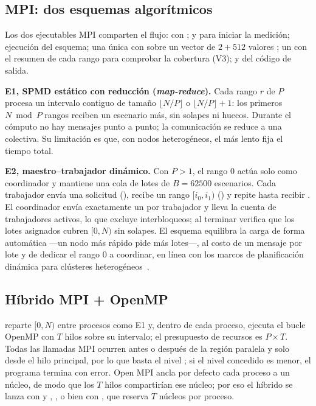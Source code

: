 \subsection{MPI: dos esquemas algorítmicos}

Los dos ejecutables MPI comparten el flujo:  con ;  y  para iniciar la medición; ejecución del esquema; una única  con  sobre un vector de $2 + 512$ valores ; un  con el resumen de cada rango para comprobar la cobertura (V3); y  del código de salida.

\textbf{E1, SPMD estático con reducción (\emph{map-reduce}).} Cada rango $r$ de $P$ procesa un intervalo contiguo de tamaño $\lfloor N/P\rfloor$ o $\lfloor N/P\rfloor + 1$: los primeros $N \bmod P$ rangos reciben un escenario más, sin solapes ni huecos. Durante el cómputo no hay mensajes punto a punto; la comunicación se reduce a una colectiva. Su limitación es que, con nodos heterogéneos, el más lento fija el tiempo total.

\textbf{E2, maestro--trabajador dinámico.} Con $P > 1$, el rango 0 actúa solo como coordinador y mantiene una cola de lotes de $B = \num{62500}$ escenarios. Cada trabajador envía una solicitud (), recibe un rango $[i_0, i_1)$ () y repite hasta recibir . El coordinador envía exactamente un  por trabajador y lleva la cuenta de trabajadores activos, lo que excluye interbloqueos; al terminar verifica que los lotes asignados cubren $[0, N)$ sin solapes. El esquema equilibra la carga de forma automática ---un nodo más rápido pide más lotes---, al costo de un mensaje por lote y de dedicar el rango 0 a coordinar, en línea con los marcos de planificación dinámica para clústeres heterogéneos~\cite{tse2010}.

\subsection{Híbrido MPI + OpenMP}

 reparte $[0, N)$ entre procesos como E1 y, dentro de cada proceso, ejecuta el bucle OpenMP con $T$ hilos sobre su intervalo; el presupuesto de recursos es $P\times T$. Todas las llamadas MPI ocurren antes o después de la región paralela y solo desde el hilo principal, por lo que basta el nivel ; si el nivel concedido es menor, el programa termina con error. Open MPI ancla por defecto cada proceso a un núcleo, de modo que los $T$ hilos compartirían ese núcleo; por eso el híbrido se lanza con  y , , o bien con , que reserva $T$ núcleos por proceso.

